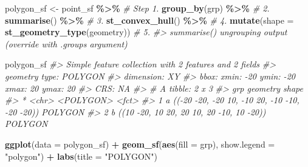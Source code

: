 \documentclass[
]{report}
\newenvironment{Shaded}{\begin{snugshade}}{\end{snugshade}}
\newcommand{\CommentTok}[1]{\textcolor[rgb]{0.56,0.35,0.01}{\textit{#1}}}
\newcommand{\DataTypeTok}[1]{\textcolor[rgb]{0.13,0.29,0.53}{#1}}
\newcommand{\KeywordTok}[1]{\textcolor[rgb]{0.13,0.29,0.53}{\textbf{#1}}}
\newcommand{\NormalTok}[1]{#1}
\newcommand{\OperatorTok}[1]{\textcolor[rgb]{0.81,0.36,0.00}{\textbf{#1}}}
\newcommand{\StringTok}[1]{\textcolor[rgb]{0.31,0.60,0.02}{#1}}
\begin{document}
\begin{Shaded}
\begin{Highlighting}[]
\NormalTok{polygon\_sf \textless{}{-}}\StringTok{ }\NormalTok{point\_sf }\OperatorTok{\%\textgreater{}\%}\StringTok{                   }\CommentTok{\# Step 1.}
\StringTok{  }\KeywordTok{group\_by}\NormalTok{(grp) }\OperatorTok{\%\textgreater{}\%}\StringTok{                          }\CommentTok{\# 2.}
\StringTok{  }\KeywordTok{summarise}\NormalTok{() }\OperatorTok{\%\textgreater{}\%}\StringTok{                            }\CommentTok{\# 3.}
\StringTok{  }\KeywordTok{st\_convex\_hull}\NormalTok{() }\OperatorTok{\%\textgreater{}\%}\StringTok{                       }\CommentTok{\# 4.}
\StringTok{  }\KeywordTok{mutate}\NormalTok{(}\DataTypeTok{shape =} \KeywordTok{st\_geometry\_type}\NormalTok{(geometry)) }\CommentTok{\# 5.}
\CommentTok{\#\textgreater{} \textasciigrave{}summarise()\textasciigrave{} ungrouping output (override with \textasciigrave{}.groups\textasciigrave{} argument)}

\NormalTok{polygon\_sf}
\CommentTok{\#\textgreater{} Simple feature collection with 2 features and 2 fields}
\CommentTok{\#\textgreater{} geometry type:  POLYGON}
\CommentTok{\#\textgreater{} dimension:      XY}
\CommentTok{\#\textgreater{} bbox:           xmin: {-}20 ymin: {-}20 xmax: 20 ymax: 20}
\CommentTok{\#\textgreater{} CRS:            NA}
\CommentTok{\#\textgreater{} \# A tibble: 2 x 3}
\CommentTok{\#\textgreater{}   grp                                        geometry shape  }
\CommentTok{\#\textgreater{} * \textless{}chr\textgreater{}                                     \textless{}POLYGON\textgreater{} \textless{}fct\textgreater{}  }
\CommentTok{\#\textgreater{} 1 a     (({-}20 {-}20, {-}20 10, {-}10 20, {-}10 {-}10, {-}20 {-}20)) POLYGON}
\CommentTok{\#\textgreater{} 2 b          ((10 {-}20, 10 20, 20 10, 20 {-}10, 10 {-}20)) POLYGON}
\end{Highlighting}
\end{Shaded}

\begin{Shaded}
\begin{Highlighting}[]
\KeywordTok{ggplot}\NormalTok{(}\DataTypeTok{data =}\NormalTok{ polygon\_sf) }\OperatorTok{+}\StringTok{ }
\StringTok{  }\KeywordTok{geom\_sf}\NormalTok{(}\KeywordTok{aes}\NormalTok{(}\DataTypeTok{fill =}\NormalTok{ grp), }\DataTypeTok{show.legend =} \StringTok{"polygon"}\NormalTok{) }\OperatorTok{+}
\StringTok{  }\KeywordTok{labs}\NormalTok{(}\DataTypeTok{title =} \StringTok{"POLYGON"}\NormalTok{)}
\end{Highlighting}
\end{Shaded}
\end{document}
